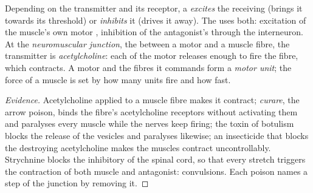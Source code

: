\begin{proposition}\label{prop:g12:stretch-reflex:junction}
Depending on the transmitter and its receptor, a 
\emph{excites} the receiving  (brings it towards its threshold)
or \emph{inhibits} it (drives it away). The  uses both:
excitation of the muscle's own motor , inhibition of the
antagonist's through the interneuron. At the \emph{neuromuscular
junction}, the  between a motor  and a muscle fibre, the
transmitter is \emph{acetylcholine}: each  of the
motor  releases enough to fire the fibre, which contracts. A
motor  and the fibres it commands form a \emph{motor unit}; the
force of a muscle is set by how many units fire and how fast.
\end{proposition}
\begin{proof}[Evidence]
Acetylcholine applied to a muscle fibre makes it contract;
\emph{curare}, the arrow poison, binds the fibre's acetylcholine
receptors without activating them and paralyses every muscle while
the nerves keep firing; the toxin of botulism blocks the release of
the vesicles and paralyses likewise; an insecticide that blocks the
 destroying acetylcholine makes the muscles contract
uncontrollably. Strychnine blocks the inhibitory  of the
spinal cord, so that every stretch triggers the contraction of both
muscle and antagonist: convulsions. Each poison names a step of the
junction by removing it.
\end{proof}

